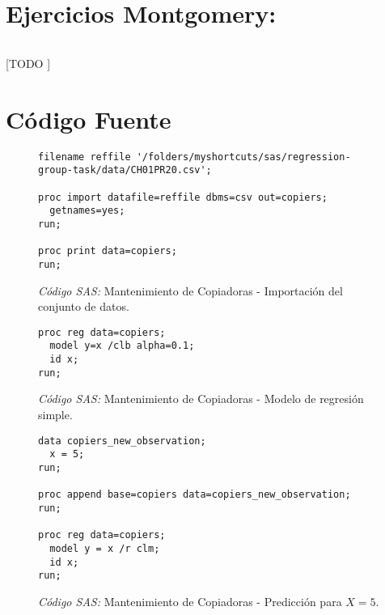 \documentclass{article}
\begin{document}
  \part{Ejercicios Montgomery:}

    \paragraph{}
    [TODO ]


  \part{Código Fuente}

    \begin{figure}[!h]
      \centering
      \begin{verbatim}
filename reffile '/folders/myshortcuts/sas/regression-group-task/data/CH01PR20.csv';

proc import datafile=reffile dbms=csv out=copiers;
  getnames=yes;
run;

proc print data=copiers;
run;
      \end{verbatim}
      \caption{\emph{Código SAS:} Mantenimiento de Copiadoras - Importación del conjunto de datos.}
      \label{code:sas-copiers-1}
    \end{figure}


    \begin{figure}[!h]
      \centering
      \begin{verbatim}
proc reg data=copiers;
  model y=x /clb alpha=0.1;
  id x;
run;
      \end{verbatim}
      \caption{\emph{Código SAS:} Mantenimiento de Copiadoras - Modelo de regresión simple.}
      \label{code:sas-copiers-2}
    \end{figure}

    \begin{figure}[!h]
      \centering
      \begin{verbatim}
data copiers_new_observation;
  x = 5;
run;

proc append base=copiers data=copiers_new_observation;
run;

proc reg data=copiers;
  model y = x /r clm;
  id x;
run;
      \end{verbatim}
      \caption{\emph{Código SAS:} Mantenimiento de Copiadoras - Predicción para $X = 5$.}
      \label{code:sas-copiers-3}
    \end{figure}
\end{document}
